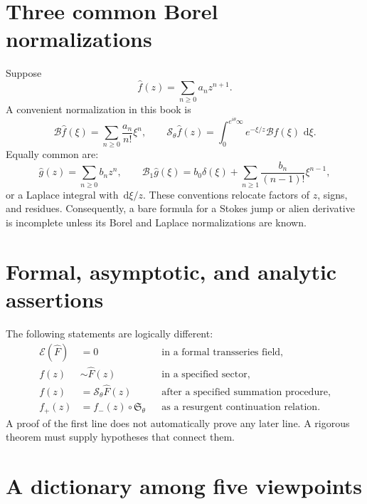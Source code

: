 \documentclass[11pt,openany]{book}
\theoremstyle{definition}
\theoremstyle{plain}
\theoremstyle{remark}
\newcommand{\dd}{\,\mathrm{d}}
\newcommand{\asym}{\sim}
\newcommand{\Borel}{\mathcal{B}}
\newcommand{\Stokes}{\mathfrak{S}}
\begin{document}
\section{Three common Borel normalizations}

Suppose
\[
 \widehat f(z)=\sum_{n\ge0}a_nz^{n+1}.
\]
A convenient normalization in this book is
\[
 \Borel\widehat f(\xi)=\sum_{n\ge0}\frac{a_n}{n!}\xi^n,
 \qquad
 \mathcal S_\theta\widehat f(z)
 =\int_0^{e^{i\theta}\infty}e^{-\xi/z}
   \Borel\widehat f(\xi)\,\dd\xi.
\]
Equally common are:
\[
 \widehat g(z)=\sum_{n\ge0}b_nz^n,
 \qquad
 \Borel_1\widehat g(\xi)
 =b_0\delta(\xi)+\sum_{n\ge1}\frac{b_n}{(n-1)!}\xi^{n-1},
\]
or a Laplace integral with $\dd\xi/z$. These conventions relocate factors of
$z$, signs, and residues. Consequently, a bare formula for a Stokes jump or
alien derivative is incomplete unless its Borel and Laplace normalizations
are known.

\section{Formal, asymptotic, and analytic assertions}

The following statements are logically different:
\begin{align*}
 \mathcal E(\widehat F)&=0
 &&\text{in a formal transseries field},\\
 f(z)&\asym\widehat F(z)
 &&\text{in a specified sector},\\
 f(z)&=\mathcal S_\theta\widehat F(z)
 &&\text{after a specified summation procedure},\\
 f_+(z)&=f_-(z)\circ\Stokes_\theta
 &&\text{as a resurgent continuation relation}.
\end{align*}
A proof of the first line does not automatically prove any later line. A
rigorous theorem must supply hypotheses that connect them.

\section{A dictionary among five viewpoints}
\end{document}
